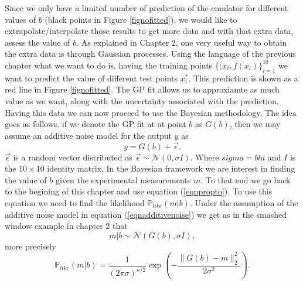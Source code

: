 \documentclass[12pt]{book}
\newcommand{\like}{\mathbb{P}_{like}}
\begin{document}
Since we only have a limited number of prediction of the emulator for different values of $b$ (black points
in Figure \ref{fignofitted}), we would like to extrapolate/interpolate those results to get
more data and with that extra data, assess the value of $b$. As explained in Chapter 2, one very useful 
way to obtain the extra data is through Gaussian processes. Using the language of the previous chapter
what we want to do is, having the training points $\{(x_{i},f(x_{i})\}_{i=1}^{10}$ we want to predict 
the value of different test points $x_{i}^{*}$. This prediction is shown as a red line in Figure
\ref{fignofitted}.  The GP fit allows us to approxiamte as much value as we want, along with the uncertainty
associated with the prediction. Having this data we can now proceed to use the Bayesian methodology.
The idea goes as follows. if we denote the GP fit at at point $b$ as  $G(b)$, then we may assume
an additive noise model for the output $y$ as
\begin{equation}\label{eqnadditivenoise}
y=G(b)+\vec{\epsilon}.
\end{equation}
$\vec{\epsilon}$ is a random vector distributed as $\vec{\epsilon}\sim\mathscr{N}(0,\sigma I)$. Where $sigma=bla$
and $I$ is the $10\times 10$ identity matrix.
In the Bayesian framework we are interest in finding the value of $b$ given the experimental measurements $m$.
To that end we go back to the begining of this chapter and use equation (\ref{eqnpropto}). To use this equation
we need to find the likelihood $\like(m|b)$. Under the assumption of the additive noise model in equation
(\ref{eqnadditivenoise}) we get as in the smashed window example in chapter 2 that
\begin{equation*}
m|b\sim\mathscr{N}(G(b),\sigma I),
\end{equation*}
more precisely
\begin{equation*}
\like(m|b)=\frac{1}{(2\pi\sigma)^{n/2}}\exp\left(-\frac{\|G(b)-m\|_{2}^{2}}{2\sigma^{2}}\right).
\end{equation*}
\end{document}
